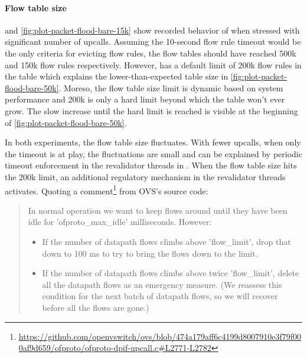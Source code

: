 \paragraph{Flow table size}
 and \cref{fig:plot-packet-flood-bare-15k} show recorded behavior of  when stressed with significant number of upcalls. Assuming the 10-second flow rule timeout would be the only criteria for evicting flow rules, the flow tables should have reached 500k and 150k flow rules respectively. However,  has a default limit of 200k flow rules in the table which explains the lower-than-expected table size in \cref{fig:plot-packet-flood-bare-50k}. Moreso, the flow table size limit is dynamic based on system performance and 200k is only a hard limit beyond which the table won't ever grow. The slow increase until the hard limit is reached is visible at the beginning of \cref{fig:plot-packet-flood-bare-50k}.

In both experiments, the flow table size fluctuates. With fewer upcalls, when only the timeout is at play, the fluctuations are small and can be explained by periodic timeout enforcement in the revalidator threads in . When the flow table size hits the 200k limit, an additional regulatory mechanism in the revalidator threads activates. Quoting a comment\footnote{\url{https://github.com/openvswitch/ovs/blob/474a179aff6c4199d8007910e3f79f000af9d659/ofproto/ofproto-dpif-upcall.c\#L2771-L2782}} from OVS's source code:

\begin{quote}
    In normal operation we want to keep flows around until they have
    been idle for 'ofproto\_max\_idle' milliseconds.  However:

    \begin{itemize}
        \item If the number of datapath flows climbs above 'flow\_limit', drop that down to 100 ms to try to bring the flows down to the limit.

        \item If the number of datapath flows climbs above twice 'flow\_limit', delete all the datapath flows as an emergency measure.  (We reassess this condition for the next batch of datapath flows, so we will recover before all the flows are gone.)
    \end{itemize}
\end{quote}

